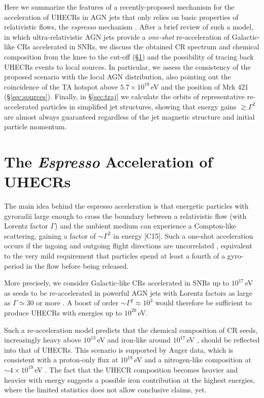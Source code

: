 \documentclass[3p,times,twocolumn]{elsarticle}
\begin{document}
Here we summarize the features of a recently-proposed mechanism for the acceleration of UHECRs in AGN jets that only relies on basic properties of relativistic flows, the \emph{espresso} mechanism \cite[][hereafter, C15]{espresso}. 
After a brief review of such a model, in which ultra-relativistic AGN jets provide a \emph{one-shot} re-acceleration of Galactic-like CRs accelerated in SNRs, we discuss the obtained CR spectrum and chemical composition from the knee to the cut-off (\S\ref{sec:esp}) and the  possibility of tracing back UHECRs events to local sources.
In particular, we assess the consistency of the proposed scenario with the local AGN distribution, also pointing out the coincidence of the TA hotspot above $5.7\times 10^{19}$\,eV and the position of Mrk 421 (\S\ref{sec:sources}).
Finally, in \S\ref{sec:traj} we calculate the orbits of representative re-accelerated particles in simplified jet structures, showing that energy gains $\gtrsim \Gamma^2$ are almost always guaranteed regardless of the jet magnetic structure and initial particle momentum.


\section{The \emph{Espresso} Acceleration of UHECRs}\label{sec:esp}
The main idea behind the espresso acceleration is that energetic particles with gyroradii large enough to cross the boundary between a relativistic flow (with Lorentz factor $\Gamma$) and the ambient medium can experience a Compton-like scattering, gaining a factor of $\sim\Gamma^2$ in energy [C15].
Such a one-shot acceleration occurs if the ingoing and outgoing flight directions are uncorrelated \cite{Achterberg+01}, equivalent to the very mild requirement that particles spend at least a fourth of a gyro-period in the flow before being released. 

More precisely, we consider Galactic-like CRs accelerated in SNRs up to $10^{17}$\,eV \cite[e.g.,][]{nuclei} as seeds to be re-accelerated in powerful AGN jets with Lorentz factors as large as $\Gamma\simeq 30$ or more \cite[e.g.,][]{Tavecchio+10}. 
A boost of order $\sim\Gamma^2\approx 10^3$ would therefore be sufficient to produce UHECRs with energies up to $10^{20}$\,eV.

Such a re-acceleration model predicts that the chemical composition of CR seeds, increasingly heavy above $10^{13}$\,eV and iron-like around $10^{17}$\,eV \cite[e.g.,][]{KU12}, should be reflected into that of UHECRs. 
This scenario is supported by Auger data, which is consistent with a proton-only flux at $10^{18}$\,eV and a nitrogen-like composition at $\sim 4\times 10^{19}$\,eV \citep{Auger14a, Auger16}.
The fact that the UHECR composition becomes heavier and heavier with energy suggests a possible iron contribution at the highest energies, where the limited statistics does not allow conclusive claims, yet. 
\end{document}
